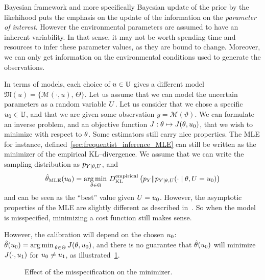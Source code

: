 \documentclass[../../Main_ManuscritThese.tex]{subfiles}
\newcommand\imgpath{/home/victor/acadwriting/Manuscrit/Text/Chapter2/img/}
\begin{document}
Bayesian framework and more specifically Bayesian update of the prior by the likehihood puts the emphasis on the update of the information on the \emph{parameter of interest}. However the environmental parameters are assumed to have an inherent variability. In that sense, it may not be worth spending time and resources to infer these parameter values, as they are bound to change.
Moreover, we can only get information on the environmental conditions used to generate the observations.


In terms of models, each choice of $\uu \in \Uspace$ gives a different model $\mathfrak{M}(u) = \{\mathcal{M}(\cdot, u),\,\Theta\}$. Let us assume that we can model the uncertain parameters as a random variable $\UU$.
Let us consider that we chose a specific $\uu_0 \in \Uspace$, and that we are given some observation $y=\mathscr{M}(\vartheta)$. We can formulate an inverse problem, and an objective function $J:\kk \mapsto J(\kk,\uu_0)$, that we wish to minimize with respect to $\kk$.
Some estimators still carry nice properties. The MLE for instance, defined~\cref{sec:frequentist_inference_MLE} can still be written as the minimizer of the empirical KL--divergence. We assume that we can write the sampling distribution as $p_{Y \mid \KK, \UU}$, and
\begin{equation}
  \estimtxt{\theta}{MLE}(\uu_0)=  \argmin_{\kk \in \Kspace}\DKL[empirical]{p_Y}{p_{Y \mid \theta, \UU}(\cdot \mid \theta, \UU=\uu_0)}
\end{equation}
and can be seen as the ``best'' value given $\UU=\uu_0$. However, the asymptotic properties of the MLE are slightly different as described in~\cite{white_maximum_1982}.
So when the model is misspecified, minimizing a cost function still makes sense.


However, the calibration will depend on the chosen $\uu_0$: $\estimtxt{\theta}{}(\uu_0) = \argmin_{\theta \in \Theta} J(\theta,\uu_0)$, and there is no guarantee that $\estimtxt{\theta}{}(\uu_0)$ will minimize $J(\cdot, \uu_1)$ for $\uu_0 \neq \uu_1$, as illustrated~\cref{fig:minimizer_misspecification}.

\begin{figure}[ht]
  \centering
  
  \caption{Effect of the misspecification on the minimizer.}
  \label{fig:minimizer_misspecification}
\end{figure}
\end{document}
